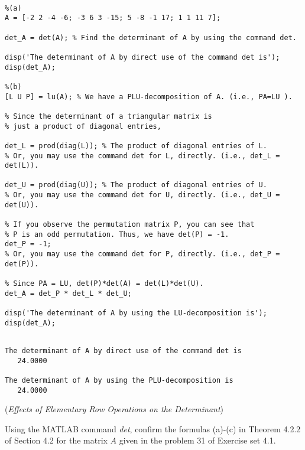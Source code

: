 \begin{sol}

\begin{verbatim}

%(a)
A = [-2 2 -4 -6; -3 6 3 -15; 5 -8 -1 17; 1 1 11 7];

det_A = det(A); % Find the determinant of A by using the command det.

disp('The determinant of A by direct use of the command det is');
disp(det_A);

%(b)
[L U P] = lu(A); % We have a PLU-decomposition of A. (i.e., PA=LU ).

% Since the determinant of a triangular matrix is
% just a product of diagonal entries,

det_L = prod(diag(L)); % The product of diagonal entries of L.
% Or, you may use the command det for L, directly. (i.e., det_L = det(L)).

det_U = prod(diag(U)); % The product of diagonal entries of U.
% Or, you may use the command det for U, directly. (i.e., det_U = det(U)).

% If you observe the permutation matrix P, you can see that
% P is an odd permutation. Thus, we have det(P) = -1.
det_P = -1;
% Or, you may use the command det for P, directly. (i.e., det_P = det(P)).

% Since PA = LU, det(P)*det(A) = det(L)*det(U).
det_A = det_P * det_L * det_U;

disp('The determinant of A by using the LU-decomposition is'); disp(det_A);
\end{verbatim}


\begin{outputs}

\begin{verbatim}

The determinant of A by direct use of the command det is
   24.0000

The determinant of A by using the PLU-decomposition is
   24.0000
\end{verbatim}

\end{outputs}

\end{sol}
 
\vspace{3mm}

\begin{exer} (\textit{Effects of Elementary Row Operations on the Determinant})

Using the MATLAB command \textit{det}, confirm the formulas (a)-(c) in Theorem 4.2.2 of Section 4.2 for the matrix $A$ given in the problem 31 of Exercise set 4.1.
\end{exer}

